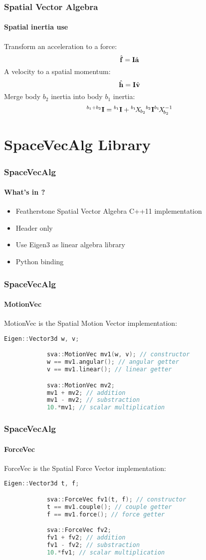 \documentclass{beamer}
\begin{document}
  	\begin{frame}
		\frametitle{Spatial Vector Algebra}
		\framesubtitle{Spatial inertia use}
		Transform an acceleration to a force:
		$$
		\forcevecHat = \inertia \accelvecHat
		$$
		A velocity to a spatial momentum:
		$$
		\momentumHat = \inertia \velocityvecHat
		$$
		Merge body $ b_2 $ inertia into body $ b_1 $ inertia:
		$$
		{}^{b_1+b_2}\inertia = {}^{b_1}\inertia + \transform{{b_2}}{{b_1}} {}^{b_2}\inertia\transformInv{{b_2}}{{b_1}}
		$$
	\end{frame}
	\section{SpaceVecAlg Library}

  	\begin{frame}
		\frametitle{SpaceVecAlg}
		\framesubtitle{What's in ?}
		\begin{itemize}
			\item Featherstone Spatial Vector Algebra C++11 implementation
			\item Header only
			\item Use Eigen3 as linear algebra library
			\item Python binding
		\end{itemize}
	\end{frame}


  	\begin{frame}[fragile]
		\frametitle{SpaceVecAlg}
		\framesubtitle{MotionVec}
		MotionVec is the Spatial Motion Vector implementation:
		\begin{lstlisting}[language=C++]
			Eigen::Vector3d w, v;

			sva::MotionVec mv1(w, v); // constructor
			w == mv1.angular(); // angular getter
			v == mv1.linear(); // linear getter

			sva::MotionVec mv2;
			mv1 + mv2; // addition
			mv1 - mv2; // substraction
			10.*mv1; // scalar multiplication
		\end{lstlisting}
	\end{frame}


  	\begin{frame}[fragile]
		\frametitle{SpaceVecAlg}
		\framesubtitle{ForceVec}
		ForceVec is the Spatial Force Vector implementation:
		\begin{lstlisting}[language=C++]
			Eigen::Vector3d t, f;

			sva::ForceVec fv1(t, f); // constructor
			t == mv1.couple(); // couple getter
			f == mv1.force(); // force getter

			sva::ForceVec fv2;
			fv1 + fv2; // addition
			fv1 - fv2; // substraction
			10.*fv1; // scalar multiplication
		\end{lstlisting}
	\end{frame}
\end{document}
